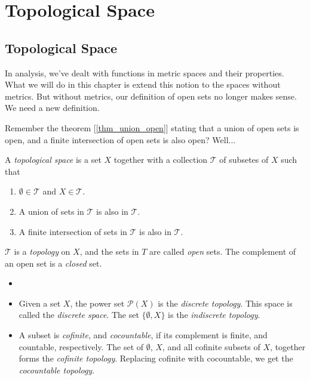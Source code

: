 

    \section{Topological Space}
    
    \subsection{Topological Space}
    
    In analysis, we've dealt with functions in metric spaces and their properties. What we will do in this chapter is extend this notion to the spaces without metrics. But without metrics, our definition of open sets no longer makes sense. We need a new definition.
    
    Remember the theorem [\ref{thm_union_open}] stating that a union of open sets is open, and a finite intersection of open sets is also open? Well...
    
    \begin{defn} \label{def_topological_space}
        A \emph{topological space} is a set $X$ together with a collection $\mathcal{T}$ of subsetes of $X$ such that \begin{enumerate}
            \item $\emptyset \in \mathcal{T}$ and $X \in \mathcal{T}$.
            \item A union of sets in $\mathcal{T}$ is also in $\mathcal{T}$.
            \item A finite intersection of sets in $\mathcal{T}$ is also in $\mathcal{T}$.
        \end{enumerate}
        
        $\mathcal{T}$ is a \emph{topology} on $X$, and the sets in $T$ are called \emph{open} sets. The complement of an open set is a \emph{closed} set.
    \end{defn}
    
    \begin{defn} \label{def_topological_space_example} \begin{itemize}
        \item []
        \item Given a set $X$, the power set $\mathcal{P}(X)$ is the \emph{discrete topology}. This space is called the \emph{discrete space}. The set $\{\emptyset, X\}$ is the \emph{indiscrete topology}.
        \item A subset is \emph{cofinite}, and \emph{cocountable}, if its complement is finite, and countable, respectively. The set of $\emptyset$, $X$, and all cofinite subsets of $X$, together forms the \emph{cofinite topology}. Replacing cofinite with cocountable, we get the \emph{cocountable topology}.
    \end{itemize}
    \end{defn}
    
